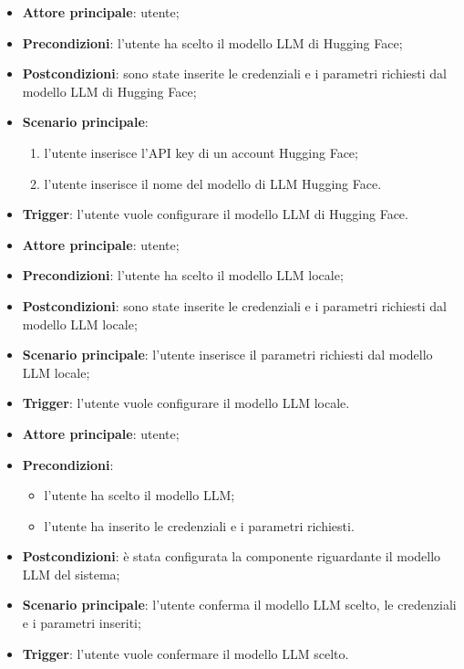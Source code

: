\documentclass[10pt, a4paper]{article}
\begin{document}
    \begin{itemize}
        \item \textbf{Attore principale}: utente;
        \item \textbf{Precondizioni}: l’utente ha scelto il modello LLM di Hugging Face;
        \item \textbf{Postcondizioni}: sono state inserite le credenziali e i parametri richiesti dal modello LLM di Hugging Face;
        \item \textbf{Scenario principale}:
            \begin{enumerate}
                \item l’utente inserisce l’API key di un account Hugging Face;
                \item l’utente inserisce il nome del modello di LLM Hugging Face.
            \end{enumerate}
        \item \textbf{Trigger}: l’utente vuole configurare il modello LLM di Hugging Face.
    \end{itemize}

    \begin{itemize}
        \item \textbf{Attore principale}: utente;
        \item \textbf{Precondizioni}: l’utente ha scelto il modello LLM locale;
        \item \textbf{Postcondizioni}: sono state inserite le credenziali e i parametri richiesti dal modello LLM locale;
        \item \textbf{Scenario principale}: l’utente inserisce il parametri richiesti dal modello LLM locale;
        \item \textbf{Trigger}: l’utente vuole configurare il modello LLM locale.
    \end{itemize}

    \begin{itemize}
        \item \textbf{Attore principale}: utente;
        \item \textbf{Precondizioni}:
            \begin{itemize}
                \item l’utente ha scelto il modello LLM;
                \item l’utente ha inserito le credenziali e i parametri richiesti.
            \end{itemize}
        \item \textbf{Postcondizioni}: è stata configurata la componente riguardante il modello LLM del sistema;
        \item \textbf{Scenario principale}: l’utente conferma il modello LLM scelto, le credenziali e i parametri inseriti;
        \item \textbf{Trigger}: l’utente vuole confermare il modello LLM scelto.
    \end{itemize}
\end{document}
